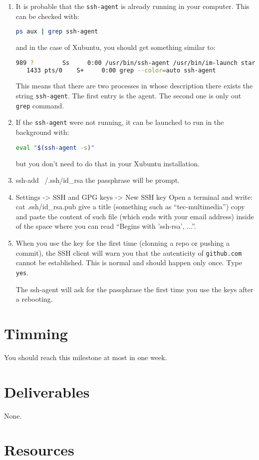 \begin{enumerate}
\item It is probable that the \texttt{ssh-agent} is already
  running in your computer. This can be checked with:

  \begin{lstlisting}[language=bash]
    ps aux | grep ssh-agent
  \end{lstlisting}

  and in the case of Xubuntu, you should get something similar to:

  \begin{lstlisting}[language=bash]
    989 ?        Ss     0:00 /usr/bin/ssh-agent /usr/bin/im-launch startxfce4
   1433 pts/0    S+     0:00 grep --color=auto ssh-agent
  \end{lstlisting}

  This means that there are two processes in whose description there
  exists the string \texttt{ssh-agent}. The first entry is the
  agent. The second one is only out \texttt{grep} command.

\item If the \texttt{ssh-agent} were not running, it can be launched to
  run in the background with:

  \begin{lstlisting}[language=bash]
    eval "$(ssh-agent -s)"
  \end{lstlisting}

  but you don't need to do that in your Xubuntu installation.

\item ssh-add ~/.ssh/id_rsa the passphrase will be prompt.
  
\item Settings -> SSH and GPG keys -> New SSH key
  Open a terminal and write:
  cat .ssh/id_rsa.pub
  give a title (something such as ``tec-multimedia'')
  copy and paste the content of such file (which ends with your email address) inside of the space where you can read ``Begins with 'ssh-rsa', ...''.

  \item When you use the key for the first time (clonning a repo or
    pushing a commit), the SSH client will warn you that the
    autenticity of \texttt{github.com} cannot be established. This is
    normal and should happen only once. Type \texttt{yes}.

The ssh-agent will ask for the passphrase the first time you use the keys after a rebooting.
  
\end{enumerate}

\section{Timming}

You should reach this milestone at most in one week.

\section{Deliverables}

None.

\section{Resources}


